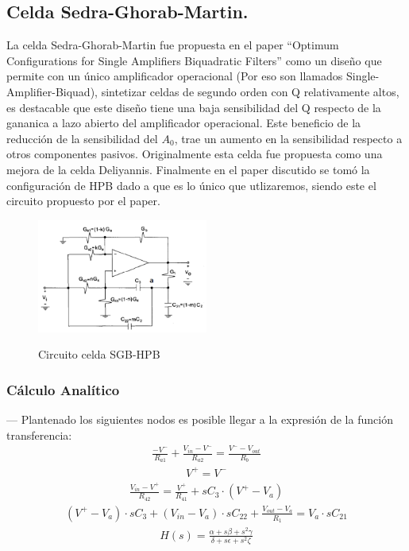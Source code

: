 \subsection{Celda Sedra-Ghorab-Martin.}
La celda Sedra-Ghorab-Martin fue propuesta en el paper ``Optimum Configurations for Single Amplifiers Biquadratic Filters'' como un diseño que permite con un único amplificador operacional (Por eso son llamados Single-Amplifier-Biquad), sintetizar celdas de segundo orden con Q relativamente altos, es destacable que este diseño tiene una baja sensibilidad del Q respecto de la gananica a lazo abierto del amplificador operacional. Este beneficio de la reducción de la sensibilidad del $A_0$, trae un aumento en la sensibilidad respecto a otros componentes pasivos. Originalmente esta celda fue propuesta como una mejora de la celda Deliyannis.
Finalmente en el paper discutido se tomó la configuración de HPB dado a que es lo único que utlizaremos, siendo este el circuito propuesto por el paper.
\begin{figure}[H]
	\centering
	\includegraphics[width=0.5\textwidth]{Imagenes-Ej3/HPBSedra.PNG}
	\label{fig:HPBSedra}
	\caption{Circuito celda SGB-HPB}
\end{figure}
\subsubsection{Cálculo Analítico}
---
Plantenado los siguientes nodos es posible llegar a la expresión de la función transferencia:\\
\begin{align}
\frac{-V^-}{R_{a1}}+\frac{V_{in}-V^-}{R_{a2}}=\frac{V^--V_{out}}{R_b}
\end{align}
\begin{align}
V^+=V^-
\end{align}
\begin{align}
\frac{V_{in}-V^+}{R_{42}}=\frac{V^+}{R_{41}}+sC_3\cdot (V^+-V_a)
\end{align}
\begin{align}
(V^+-V_a)\cdot sC_3 + (V_{in}-V_a)\cdot sC_{22}+\frac{V_{out}-V_a}{R_1}=V_a\cdot sC_{21}
\end{align}
\begin{align}
H(s)=
{\frac { \alpha +s \beta +{s}^{2} \gamma }{\delta+s \epsilon +{s}^{2} \zeta }
}
\end{align}



